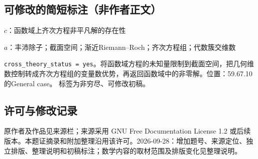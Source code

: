 \documentclass[UTF8,11pt]{ctexart}
\theoremstyle{definition}
\begin{document}
\subsection*{可修改的简短标注（非作者正文）}
$c$：函数域上齐次方程非平凡解的存在性

$a$：丰沛除子；截面空间；渐近Riemann--Roch；齐次方程组；代数簇交维数

\texttt{cross\_theory\_status = yes}。将函数域方程的未知量限制到截面空间，把几何维数控制转成齐次方程组的变量数优势，再返回函数域中的非零解。位置：59.67.10的General case。
标签为非穷尽、可修改初稿。
\subsection*{许可与修改记录}
原作者及作品见来源栏；来源采用 GNU Free Documentation License 1.2 或后续版本。本题证摘录和附加整理沿用该许可。2026-09-28：增加题号、来源定位、独立排版、整理说明和初稿标注；数学内容的取材范围及排版变化见整理说明。
\end{document}
